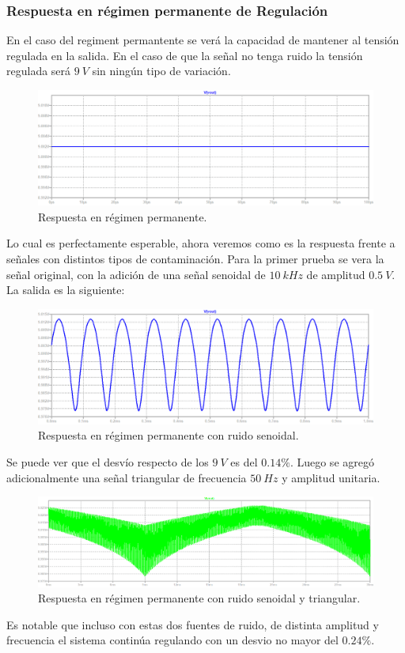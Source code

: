 \subsubsection{Respuesta en régimen permanente de Regulación}
En el caso del regiment permantente se verá la capacidad de mantener al tensión regulada en la salida.
En el caso de que la señal no tenga ruido la tensión regulada será $9 \ V$ sin ningún tipo de variación.
\begin{figure}[H]
\centering
	\includegraphics[width=1\textwidth]{ImagenesEjercicio2/permresp.png}
	\caption{Respuesta en régimen permanente.}
	\label{fig:permanenteFuente}
\end{figure}
Lo cual es perfectamente esperable, ahora veremos como es la respuesta frente a señales con distintos tipos de contaminación.
Para la primer prueba se vera la señal original, con la adición de una señal senoidal de $10 \ kHz$ de amplitud $0.5 \ V$.
La salida es la siguiente:
\begin{figure}[H]
\centering
	\includegraphics[width=1\textwidth]{ImagenesEjercicio2/permrespsine.png}
	\caption{Respuesta en régimen permanente con ruido senoidal.}
	\label{fig:permanenteFuentesine}
\end{figure}
Se puede ver que el desvío respecto de los $9 \ V$ es del $0.14\%$.
Luego se agregó adicionalmente una señal triangular de frecuencia $50 \ Hz$ y amplitud unitaria.
\begin{figure}[H]
\centering
	\includegraphics[width=1\textwidth]{ImagenesEjercicio2/permrespsinetri.png}
	\caption{Respuesta en régimen permanente con ruido senoidal y triangular.}
	\label{fig:permanenteFuentesinetri}
\end{figure}
Es notable que incluso con estas dos fuentes de ruido, de distinta amplitud y frecuencia el sistema continúa regulando con un desvio no mayor del $0.24\%$.
